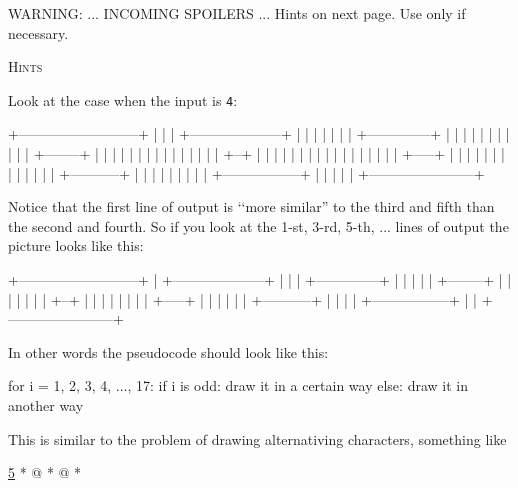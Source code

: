 WARNING: ... INCOMING SPOILERS ...
Hints on next page.
Use only if necessary.

\newpage
\textsc{Hints}

Look at the case when the input is \verb!4!:
{\small
\begin{console}[commandchars=\\\{\}]
+--------------------------+
|                          |
|  +--------------------+  |
|  |                    |  |
|  |  +--------------+  |  |
|  |  |              |  |  |
|  |  |  +--------+  |  |  |
|  |  |  |        |  |  |  |
|  |  |  |  +--+  |  |  |  |
|  |  |  |  |     |  |  |  |
|  |  |  |  +-----+  |  |  |
|  |  |  |           |  |  |
|  |  |  +-----------+  |  |
|  |  |                 |  |
|  |  +-----------------+  |
|  |                       |
|  +-----------------------+
\end{console}
}
Notice that the first line of output is \lq\lq more similar''
to the third and fifth than the second and fourth.
So if you look at the 1-st, 3-rd, 5-th, ... lines of output
the picture looks like this:
{\small
\begin{console}[commandchars=\\\{\}]
+--------------------------+
|  +--------------------+  |
|  |  +--------------+  |  |
|  |  |  +--------+  |  |  |
|  |  |  |  +--+  |  |  |  |
|  |  |  |  +-----+  |  |  |
|  |  |  +-----------+  |  |
|  |  +-----------------+  |
|  +-----------------------+
\end{console}
}
In other words the pseudocode should look like this:
{\small
\begin{console}
for i = 1, 2, 3, 4, ..., 17:
    if i is odd:
        draw it in a certain way
    else:
        draw it in another way
\end{console}
}
This is similar to the problem of drawing alternativing characters,
something like
{\small
\begin{console}[commandchars=\\\{\}]
\underline{5}
*
@
*
@
*
\end{console}
}

